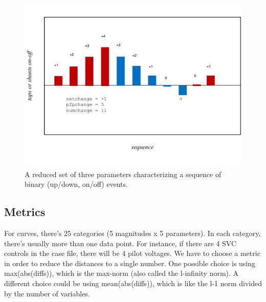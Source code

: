 \documentclass[11pt, a4paper, twoside, titlepage]{article}
\begin{document}
\begin{figure}
  \centering
  \includegraphics[width=\columnwidth]{figs/transient_characteristics_2}
  \caption{A reduced set of three parameters characterizing a sequence of binary
    (up/down, on/off) events.}
  \label{fig:tcharacteristics2}
\end{figure}



\subsection{Metrics}


For curves, there's 25 categories (5 magnitudes x 5 parameters). In
each category, there's usually more than one data point. For instance,
if there are 4 SVC controls in the case file, there will be 4 pilot
voltages. We have to choose a metric in order to reduce the distances
to a single number. One possible choice is using max(abs(diffs)),
which is the max-norm (also called the l-infinity norm).  A different
choice could be using mean(abs(diffs)), which is like the l-1 norm
divided by the number of variables.
\end{document}
